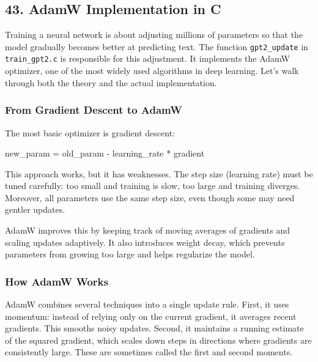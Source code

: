 \documentclass[
  letterpaper,
  DIV=11,
  numbers=noendperiod]{scrreprt}
\newenvironment{Shaded}{\begin{snugshade}}{\end{snugshade}}
\newcommand{\NormalTok}[1]{\textcolor[rgb]{0.00,0.23,0.31}{#1}}
\begin{document}
\subsection{43. AdamW Implementation in
C}\label{adamw-implementation-in-c}

Training a neural network is about adjusting millions of parameters so
that the model gradually becomes better at predicting text. The function
\texttt{gpt2\_update} in \texttt{train\_gpt2.c} is responsible for this
adjustment. It implements the AdamW optimizer, one of the most widely
used algorithms in deep learning. Let's walk through both the theory and
the actual implementation.

\subsubsection{From Gradient Descent to
AdamW}\label{from-gradient-descent-to-adamw}

The most basic optimizer is gradient descent:

\begin{Shaded}
\begin{Highlighting}[]
\NormalTok{new\_param = old\_param {-} learning\_rate * gradient}
\end{Highlighting}
\end{Shaded}

This approach works, but it has weaknesses. The step size (learning
rate) must be tuned carefully: too small and training is slow, too large
and training diverges. Moreover, all parameters use the same step size,
even though some may need gentler updates.

AdamW improves this by keeping track of moving averages of gradients and
scaling updates adaptively. It also introduces weight decay, which
prevents parameters from growing too large and helps regularize the
model.

\subsubsection{How AdamW Works}\label{how-adamw-works}

AdamW combines several techniques into a single update rule. First, it
uses momentum: instead of relying only on the current gradient, it
averages recent gradients. This smooths noisy updates. Second, it
maintains a running estimate of the squared gradient, which scales down
steps in directions where gradients are consistently large. These are
sometimes called the first and second moments.
\end{document}

